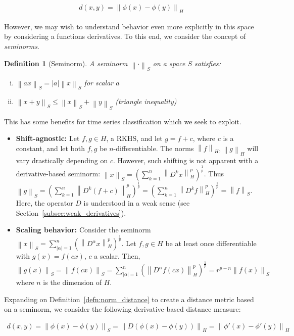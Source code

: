 \documentclass[a4paper]{article}
\newcommand{\norm}[1]{\left\lVert#1\right\rVert}
\theoremstyle{def}
\newtheorem{definition}{Definition}
\theoremstyle{thm}
\begin{document}
\begin{align}
    d(x,y) = \norm{\phi(x) - \phi(y)}_H
\end{align}

However, we may wish to understand behavior even more explicitly in this space by considering a functions derivatives.
To this end, we consider the concept of \textit{seminorms}.

\begin{definition}[Seminorm]
    A seminorm $\norm{\cdot}_S$ on a space $S$ satisfies:
    \begin{enumerate}[(i)]
        \item $\norm{ax}_S = |a|\norm{x}_S$ for scalar $a$
        \item $\norm{x + y}_S \le \norm{x}_S + \norm{y}_S$ (triangle inequality)
    \end{enumerate}
\end{definition}

This has some benefits for time series classification which we seek to exploit.
\begin{itemize}
    \item \textbf{Shift-agnostic:} Let $f,g \in H$, a RKHS, and let $g = f + c$, where $c$ is a constant, and let both $f,g$ be $n$-differentiable.
        The norms $\norm{f}_H, \norm{g}_H$ will vary drastically depending on $c$.
        However, such shifting is not apparent with a derivative-based seminorm: $\norm{x}_S = {(\sum\limits_{k=1}^n \norm{D^k x}^p_H)}^{\frac{1}{p}}$.
        Thus $\norm{g}_S = {(\sum\limits_{k=1}^n \norm{D^k (f+c)}^p_H)}^{\frac{1}{p}} = {(\sum\limits_{k=1}^n \norm{D^k f}^p_H)}^{\frac{1}{p}} = \norm{f}_S$.
        Here, the operator $D$ is understood in a weak sense (see Section~\ref{subsec:weak_derivatives}).
    \item \textbf{Scaling behavior:} Consider the seminorm $\norm{x}_S = {\sum\limits_{|\alpha| = 1}^n(\norm{D^{\alpha} x}^p_H)}^{\frac{1}{p}}$.
        Let $f,g \in H$ be at least once differentiable with $g(x) = f(cx)$, $c$ a scalar.
        Then, $\norm{g(x)}_S = \norm{f(cx)}_S = {\sum\limits_{|\alpha| = 1}^n(\norm{D^{\alpha} f(cx)}^p_H)}^{\frac{1}{p}} = r^{p-n} \norm{f(x)}_S$ where $n$ is the dimension of $H$.
\end{itemize}

Expanding on Definition~\ref{defn:norm_distance} to create a distance metric based on a seminorm, we consider the following derivative-based distance measure:

\begin{align}
    d(x,y) = \norm{\phi(x)-\phi(y)}_S = \norm{D (\phi(x) - \phi(y))}_H = \norm{\phi'(x) - \phi'(y)}_H
\end{align}
\end{document}
